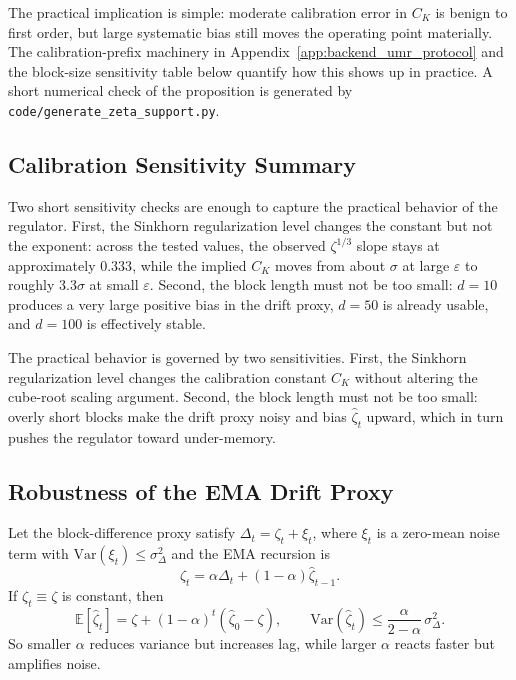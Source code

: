 

The practical implication is simple: moderate calibration error in $C_K$ is
benign to first order, but large systematic bias still moves the operating point
materially. The calibration-prefix machinery in Appendix~\ref{app:backend_umr_protocol}
and the block-size sensitivity table below quantify how this shows up in
practice.
A short numerical check of the proposition is generated by
\texttt{code/generate\_zeta\_support.py}.

\subsection{Calibration Sensitivity Summary}

Two short sensitivity checks are enough to capture the practical behavior of the
regulator. First, the Sinkhorn regularization level changes the constant but not
the exponent: across the tested values, the observed $\zeta^{1/3}$ slope stays
at approximately $0.333$, while the implied $C_K$ moves from about $\sigma$ at
large $\varepsilon$ to roughly $3.3\sigma$ at small $\varepsilon$. Second, the
block length must not be too small: $d=10$ produces a very large positive bias in
the drift proxy, $d=50$ is already usable, and $d=100$ is effectively stable.

The practical behavior is governed by two sensitivities. First, the Sinkhorn
regularization level changes the calibration constant $C_K$ without altering the
cube-root scaling argument. Second, the block length must not be too small:
overly short blocks make the drift proxy noisy and bias $\widehat\zeta_t$
upward, which in turn pushes the regulator toward under-memory.

\subsection{Robustness of the EMA Drift Proxy}

Let the block-difference proxy satisfy $\Delta_t = \zeta_t + \xi_t$, where
$\xi_t$ is a zero-mean noise term with $\mathrm{Var}(\xi_t) \leq \sigma_\Delta^2$
and the EMA recursion is
\[
  \widehat\zeta_t = \alpha\Delta_t + (1-\alpha)\widehat\zeta_{t-1}.
\]
If $\zeta_t \equiv \zeta$ is constant, then
\[
  \mathbb E[\widehat\zeta_t] = \zeta + (1-\alpha)^t(\widehat\zeta_0-\zeta),
  \qquad
  \mathrm{Var}(\widehat\zeta_t) \leq \frac{\alpha}{2-\alpha}\,\sigma_\Delta^2.
\]
So smaller $\alpha$ reduces variance but increases lag, while larger $\alpha$
reacts faster but amplifies noise.

